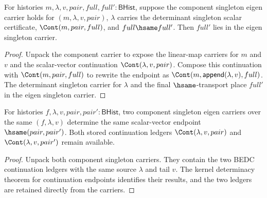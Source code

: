 \begin{theorem}
\label{thm:eigen-component-singleton-carrier-cont-result-transport}
For histories \(m,\lambda,v,pair,full,full':\mathsf{BHist}\), suppose the
component singleton eigen carrier holds for \((m,\lambda,v,pair)\),
\(\lambda\) carries the determinant singleton scalar certificate,
\(\Cont(m,pair,full)\), and \(full\hsame full'\). Then \(full'\) lies in the
eigen singleton carrier.
\end{theorem}
\begin{proof}
Unpack the component carrier to expose the linear-map carriers for \(m\) and
\(v\) and the scalar-vector continuation \(\Cont(\lambda,v,pair)\). Compose
this continuation with \(\Cont(m,pair,full)\) to rewrite the endpoint as
\(\Cont(m,\mathsf{append}(\lambda,v),full)\). The determinant singleton carrier
for \(\lambda\) and the final \(\hsame\)-transport place \(full'\) in the
eigen singleton carrier.
\end{proof}

\begin{theorem}
\label{thm:eigen-component-singleton-carrier-pair-deterministic}
For histories $f,\lambda,v,pair,pair':\mathsf{BHist}$, two component
singleton eigen carriers over the same $(f,\lambda,v)$ determine the same
scalar-vector endpoint $\hsame(pair,pair')$. Both stored continuation ledgers
$\Cont(\lambda,v,pair)$ and $\Cont(\lambda,v,pair')$ remain available.
\end{theorem}
\begin{proof}
Unpack both component singleton carriers. They contain the two BEDC
continuation ledgers with the same source $\lambda$ and tail $v$. The
kernel determinacy theorem for continuation endpoints identifies their
results, and the two ledgers are retained directly from the carriers.
\end{proof}


